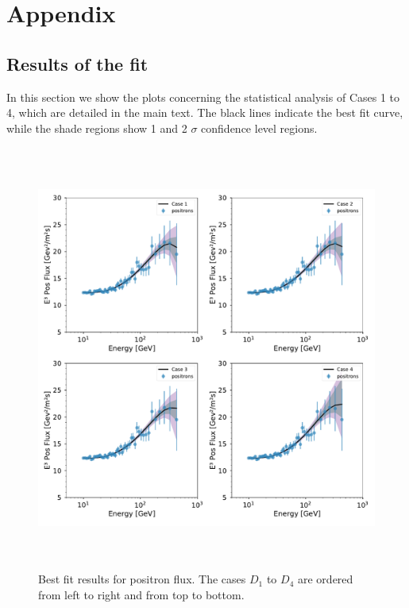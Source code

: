 \documentclass[a4paper,11pt]{article}
\begin{document}
\appendix
\section{Appendix}
\subsection{Results of the fit}

In this section we show the plots concerning the statistical analysis of Cases 1 to 4, which are detailed in the main text. The black lines indicate the best fit curve, while the shade regions show 1 and 2 $\sigma$ confidence level regions.

\begin{figure}[htb]
\begin{center}
\includegraphics[height=14cm,width=14cm,angle=0]{Figures/pymultinest_fit_case_5_positron_flux.pdf}
\caption{Best fit results for positron flux. The cases $D_1$ to $D_4$ are ordered from left to right and from top to bottom.}
\label{fig:bf-positron-spectrum}
\end{center}
\end{figure}
\end{document}

